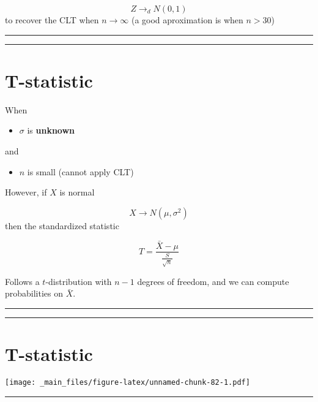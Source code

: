 \documentclass[
]{book}
\providecommand{\tightlist}{%
  \setlength{\itemsep}{0pt}\setlength{\parskip}{0pt}}
\begin{document}
\[Z \rightarrow_d N(0,1)\] to recover the CLT when \(n\rightarrow \infty\) (a good aproximation is when \(n>30\))

\begin{center}\rule{0.5\linewidth}{0.5pt}\end{center}

\begin{center}\rule{0.5\linewidth}{0.5pt}\end{center}

\hypertarget{t-statistic}{%
\section{T-statistic}\label{t-statistic}}

When

\begin{itemize}
\tightlist
\item
  \(\sigma\) is \textbf{unknown}
\end{itemize}

and

\begin{itemize}
\tightlist
\item
  \(n\) is small (cannot apply CLT)
\end{itemize}

However, if \(X\) is normal

\[X \rightarrow N(\mu, \sigma^2)\] then the standardized statistic

\[T=\frac{\bar{X}-\mu}{\frac{S}{\sqrt{n}}} \]

Follows a \(t\)-distribution with \(n-1\) degrees of freedom, and we can compute probabilities on \(\bar{X}\).

\begin{center}\rule{0.5\linewidth}{0.5pt}\end{center}

\begin{center}\rule{0.5\linewidth}{0.5pt}\end{center}

\hypertarget{t-statistic-1}{%
\section{T-statistic}\label{t-statistic-1}}

\texttt{[image: \_main\_files/figure-latex/unnamed-chunk-82-1.pdf]}

\begin{center}\rule{0.5\linewidth}{0.5pt}\end{center}
\end{document}
